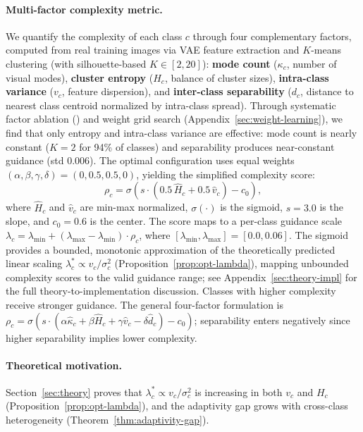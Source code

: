 \paragraph{Multi-factor complexity metric.}
We quantify the complexity of each class $c$ through four complementary factors, computed from real training images via VAE feature extraction and $K$-means clustering (with silhouette-based $K \in [2, 20]$): \textbf{mode count} ($\kappa_c$, number of visual modes), \textbf{cluster entropy} ($H_c$, balance of cluster sizes), \textbf{intra-class variance} ($v_c$, feature dispersion), and \textbf{inter-class separability} ($d_c$, distance to nearest class centroid normalized by intra-class spread). Through systematic factor ablation () and weight grid search (Appendix~\ref{sec:weight-learning}), we find that only entropy and intra-class variance are effective: mode count is nearly constant ($K{=}2$ for 94\% of classes) and separability produces near-constant guidance (std $0.006$). The optimal configuration uses equal weights $(\alpha, \beta, \gamma, \delta) = (0, 0.5, 0.5, 0)$, yielding the simplified complexity score:
\begin{equation}
    \rho_c = \sigma\!\left(s \cdot \left(0.5\,\hat{H}_c + 0.5\,\hat{v}_c\right) - c_0\right),
    \label{eq:complexity-simplified}
\end{equation}
where $\hat{H}_c$ and $\hat{v}_c$ are min-max normalized, $\sigma(\cdot)$ is the sigmoid, $s = 3.0$ is the slope, and $c_0 = 0.6$ is the center. The score maps to a per-class guidance scale $\lambda_c = \lambda_{\min} + (\lambda_{\max} - \lambda_{\min}) \cdot \rho_c$, where $[\lambda_{\min}, \lambda_{\max}] = [0.0, 0.06]$. The sigmoid provides a bounded, monotonic approximation of the theoretically predicted linear scaling $\lambda_c^* \propto v_c / \sigma_c^2$ (Proposition~\ref{prop:opt-lambda}), mapping unbounded complexity scores to the valid guidance range; see Appendix~\ref{sec:theory-impl} for the full theory-to-implementation discussion. Classes with higher complexity receive stronger guidance. The general four-factor formulation is $\rho_c = \sigma\!\left(s \cdot (\alpha\hat{\kappa}_c + \beta\hat{H}_c + \gamma\hat{v}_c - \delta\hat{d}_c) - c_0\right)$; separability enters negatively since higher separability implies lower complexity.

\paragraph{Theoretical motivation.}
Section~\ref{sec:theory} proves that $\lambda_c^* \propto v_c / \sigma_c^2$ is increasing in both $v_c$ and $H_c$ (Proposition~\ref{prop:opt-lambda}), and the adaptivity gap grows with cross-class heterogeneity (Theorem~\ref{thm:adaptivity-gap}).

